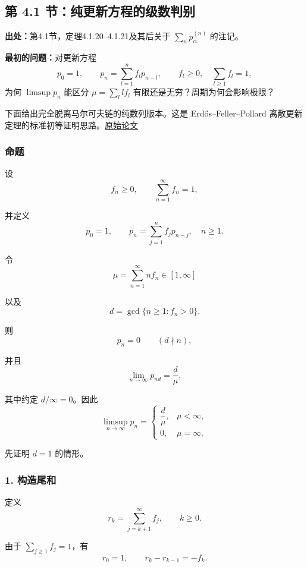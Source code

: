 \documentclass[11pt,a4paper]{ctexart}
\begin{document}
\subsection{第 4.1 节：纯更新方程的级数判别}
\label{note:sp-renewal-series-limit}
\textbf{出处：}第4.1节，定理4.1.20--4.1.21及其后关于 $\sum_n p_{ii}^{(n)}$ 的注记。

\textbf{最初的问题：}对更新方程
\[
 p_0=1,\qquad p_n=\sum_{l=1}^n f_l p_{n-l},\qquad
 f_l\ge0,\quad \sum_{l\ge1}f_l=1,
\]
为何 $\limsup p_n$ 能区分 $\mu=\sum_l l f_l$ 有限还是无穷？周期为何会影响极限？

下面给出完全脱离马尔可夫链的纯数列版本。这是 Erdős–Feller–Pollard 离散更新定理的标准初等证明思路。\href{https://sites.oxy.edu/lengyel/M372/1949-01Original%20Erdos-Feller_Pollard%20paper%20on%20renwal%20theory.pdf}{原始论文}

\subsubsection*{命题}

设
\[
f_n\ge0,\qquad \sum_{n=1}^{\infty}f_n=1,
\]

并定义
\[
p_0=1,\qquad
p_n=\sum_{j=1}^n f_jp_{n-j},\quad n\ge1.
\]

令
\[
\mu=\sum_{n=1}^{\infty}nf_n\in[1,\infty]
\]

以及
\[
d=\gcd\{n\ge1:f_n>0\}.
\]

则
\[
p_n=0\qquad(d\nmid n),
\]

并且
\[
\boxed{\lim_{n\to\infty}p_{nd}=\frac d\mu},
\]

其中约定 $d/\infty=0$。因此
\[
\boxed{
\limsup_{n\to\infty}p_n=
\begin{cases}
\dfrac d\mu,&\mu<\infty,\\[5pt]
0,&\mu=\infty.
\end{cases}}
\]

先证明 $d=1$ 的情形。

\subsubsection*{1. 构造尾和}

定义
\[
r_k=\sum_{j=k+1}^{\infty}f_j,\qquad k\ge0.
\]

由于 $\sum_{j\ge1}f_j=1$，有
\[
r_0=1,\qquad r_k-r_{k-1}=-f_k.
\]
\end{document}
